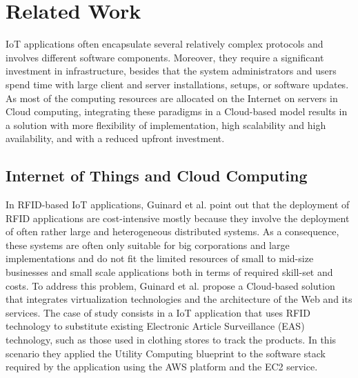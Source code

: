 \section{Related Work}
\label{sec:related_work}
IoT applications often encapsulate several relatively complex protocols and involves
different software components. Moreover, they require a significant investment in infrastructure,
besides that the system administrators and users spend time with large client and server
installations, setups, or software updates. As most of the computing resources are allocated
on the Internet on servers in Cloud computing, integrating these paradigms in a Cloud-based model
results in a solution with more flexibility of implementation, high scalability and high availability,
and with a reduced upfront investment.\\

\subsection{Internet of Things and Cloud Computing}
\label{sub:Cloud Computing and Internet of Things}
In RFID-based IoT applications, Guinard et al. \cite{guinard2011cloud} point out that the
deployment of RFID applications are cost-intensive mostly because they involve the
deployment of often rather large and heterogeneous distributed systems. As a consequence,
these systems are often only suitable for big corporations and large implementations and
do not fit the limited resources of small to mid-size businesses and small scale applications
both in terms of required skill-set and costs. To address this problem, Guinard et al. propose
a Cloud-based solution that integrates virtualization technologies and the architecture of
the Web and its services. The case of study consists in a IoT application that uses RFID technology
to substitute existing Electronic Article Surveillance (EAS) technology, such as those used in
clothing stores to track the products. In this scenario they applied the Utility Computing blueprint
to the software stack required by the application using the AWS platform and the EC2 service.\\


